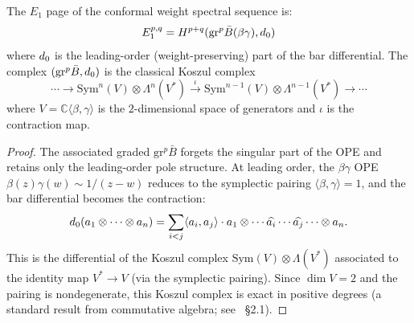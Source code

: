 \begin{proposition}
\label{prop:betagamma-E1-page}
The $E_1$ page of the conformal weight spectral sequence is:
\begin{equation}\label{eq:betagamma-E1}
E_1^{p,q} = H^{p+q}(\mathrm{gr}^p \bar{B}(\beta\gamma), d_0)
\end{equation}
where $d_0$ is the leading-order (weight-preserving) part of
the bar differential.  The complex
$(\mathrm{gr}^p \bar{B}, d_0)$ is the classical Koszul complex
\begin{equation}\label{eq:classical-koszul}
\cdots \to \mathrm{Sym}^n(V) \otimes \Lambda^n(V^*)
\xrightarrow{\;\iota\;} \mathrm{Sym}^{n-1}(V)
\otimes \Lambda^{n-1}(V^*) \to \cdots
\end{equation}
where $V = \mathbb{C}\langle \beta, \gamma \rangle$ is the
$2$-dimensional space of generators and $\iota$ is the
contraction map.
\end{proposition}

\begin{proof}
The associated graded $\mathrm{gr}^p \bar{B}$ forgets the
singular part of the OPE and retains only the leading-order
pole structure.  At leading order, the $\beta\gamma$ OPE
$\beta(z)\gamma(w) \sim 1/(z-w)$ reduces to the symplectic
pairing $\langle \beta, \gamma \rangle = 1$, and the bar
differential becomes the contraction:
\[
d_0(a_1 \otimes \cdots \otimes a_n)
= \sum_{i < j} \langle a_i, a_j \rangle \cdot
a_1 \otimes \cdots \widehat{a_i} \cdots \widehat{a_j}
\cdots \otimes a_n.
\]
This is the differential of the Koszul complex
$\mathrm{Sym}(V) \otimes \Lambda(V^*)$ associated to the
identity map $V^* \to V$ (via the symplectic pairing).  Since
$\dim V = 2$ and the pairing is nondegenerate, this Koszul
complex is exact in positive degrees (a standard result from
commutative algebra; see~\cite{LV12} \S2.1).
\end{proof}

